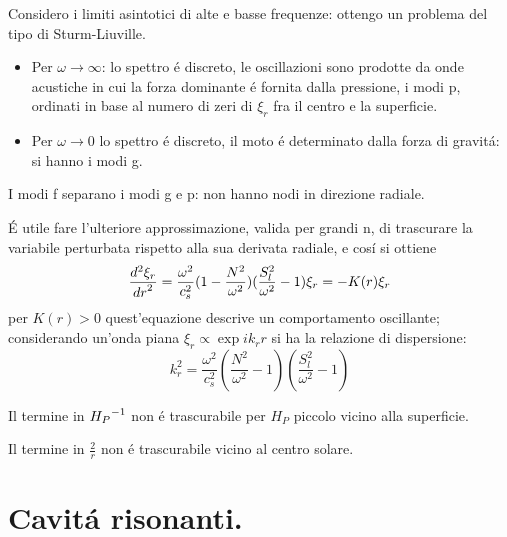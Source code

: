 \documentclass[../main.tex]{subfiles}
\begin{document}
\begin{workout}
Considero i limiti asintotici di alte e basse frequenze: ottengo un problema del tipo di Sturm-Liuville.
\begin{itemize}
\item Per $\omega\to\infty$: lo spettro \'e discreto, le oscillazioni sono prodotte da onde acustiche in cui la forza dominante \'e fornita dalla pressione, i modi p, ordinati in base al numero di zeri di $\xi_r$ fra il centro e la superficie.

\item Per $\omega\to0$ lo spettro \'e discreto, il moto \'e determinato dalla forza di gravit\'a: si hanno i modi g.

\end{itemize}
I modi f separano i modi g e p: non hanno nodi in direzione radiale.
\end{workout}

\'E utile fare l'ulteriore approssimazione, valida per grandi n, di trascurare la variabile perturbata rispetto alla sua derivata radiale, e cos\'i si ottiene
\begin{equation}\label{eq:secondorder}
\TtwoDy{r}{\xi_r}=\frac{\omega^2}{c_s^2}(1-\frac{N^2}{\omega^2})(\frac{S_l^2}{\omega^2}-1)\xi_r=-K(r)\xi_r
\end{equation}
per $K(r)>0$ quest'equazione descrive un comportamento oscillante; considerando un'onda piana $\xi_r\propto\exp{ik_rr}$ si ha la relazione di dispersione:
\begin{equation}
k_r^2=\frac{\omega^2}{c_s^2}(\frac{N^2}{\omega^2}-1)(\frac{S_l^2}{\omega^2}-1)\label{eq:approximatedispersion}
\end{equation}

\begin{workout}

Il termine in $\invers{H_P}$ non \'e trascurabile per $H_P$ piccolo vicino alla superficie.

Il termine in $\frac{2}{r}$ non \'e trascurabile vicino al centro solare.

\end{workout}

\section{Cavit\'a risonanti.} \label{sec:resonantcavity} %
\end{document}
